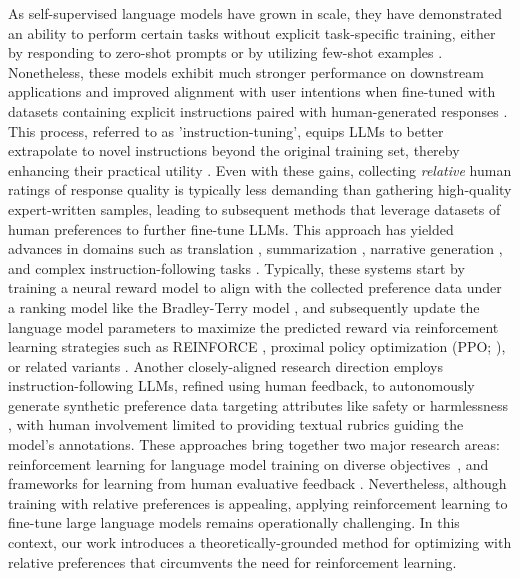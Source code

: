 As self-supervised language models have grown in scale, they have demonstrated an ability to perform certain tasks without explicit task-specific training, either by responding to zero-shot prompts \citep{radford2019language} or by utilizing few-shot examples \citep{gpt3,megatron,chowdhery2022palm}. Nonetheless, these models exhibit much stronger performance on downstream applications and improved alignment with user intentions when fine-tuned with datasets containing explicit instructions paired with human-generated responses \citep{mishra-etal-2022-cross,sanh2022multitask,chung2022scaling,thoppilan2022lamda}. This process, referred to as 'instruction-tuning', equips LLMs to better extrapolate to novel instructions beyond the original training set, thereby enhancing their practical utility \citep{chung2022scaling}. Even with these gains, collecting \textit{relative} human ratings of response quality is typically less demanding than gathering high-quality expert-written samples, leading to subsequent methods that leverage datasets of human preferences to further fine-tune LLMs. This approach has yielded advances in domains such as translation \citep{kreutzer-etal-2018-reliability}, summarization \citep{stiennon2022learning,ziegler2020finetuning}, narrative generation \citep{ziegler2020finetuning}, and complex instruction-following tasks \citep{ouyang2022training,ramamurthy2023is}. Typically, these systems start by training a neural reward model to align with the collected preference data under a ranking model like the Bradley-Terry model \citep{bradley1952rankanalysis}, and subsequently update the language model parameters to maximize the predicted reward via reinforcement learning strategies such as REINFORCE \citep{williams1992reinforce}, proximal policy optimization (PPO; \cite{schulman2017proximal}), or related variants \citep{ramamurthy2023is}. Another closely-aligned research direction employs instruction-following LLMs, refined using human feedback, to autonomously generate synthetic preference data targeting attributes like safety or harmlessness \citep{bai2022constitutional}, with human involvement limited to providing textual rubrics guiding the model’s annotations. These approaches bring together two major research areas: reinforcement learning for language model training on diverse objectives~\citep{Ranzato2015SequenceLT,paulus2018a,wu2018learning}, and frameworks for learning from human evaluative feedback \citep{christiano2017deep,kupcsik2018learning}. Nevertheless, although training with relative preferences is appealing, applying reinforcement learning to fine-tune large language models remains operationally challenging. In this context, our work introduces a theoretically-grounded method for optimizing with relative preferences that circumvents the need for reinforcement learning.

